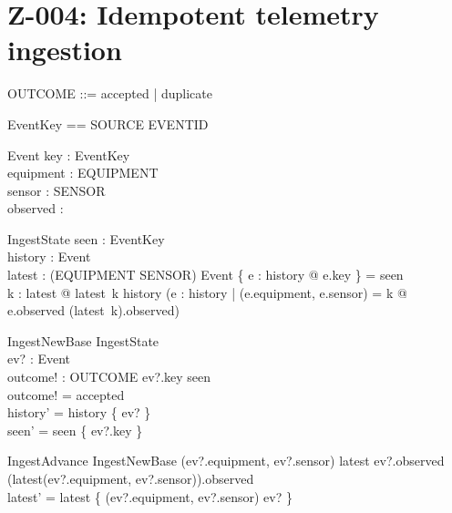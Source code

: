 \documentclass{article}
\begin{document}
\section*{Z-004: Idempotent telemetry ingestion}

\begin{zed}
\end{zed}

\begin{zed}
  OUTCOME ::= accepted | duplicate
\end{zed}

\begin{zed}
  EventKey == SOURCE \cross EVENTID
\end{zed}

\begin{schema}{Event}
  key : EventKey \\
  equipment : EQUIPMENT \\
  sensor : SENSOR \\
  observed : \nat
\end{schema}

\begin{schema}{IngestState}
  seen : \power EventKey \\
  history : \power Event \\
  latest : (EQUIPMENT \cross SENSOR) \pfun Event
\where
  \{ e : history @ e.key \} = seen \\
  \forall k : \dom latest @ latest~k \in history \land
    (\forall e : history | (e.equipment, e.sensor) = k @
       e.observed \leq (latest~k).observed)
\end{schema}

\begin{schema}{IngestNewBase}
  \Delta IngestState \\
  ev? : Event \\
  outcome! : OUTCOME
\where
  ev?.key \notin seen \\
  outcome! = accepted \\
  history' = history \cup \{ ev? \} \\
  seen' = seen \cup \{ ev?.key \}
\end{schema}

\begin{schema}{IngestAdvance}
  IngestNewBase
\where
  (ev?.equipment, ev?.sensor) \notin \dom latest \lor
    ev?.observed \geq (latest(ev?.equipment, ev?.sensor)).observed \\
  latest' = latest \oplus \{ (ev?.equipment, ev?.sensor) \mapsto ev? \}
\end{schema}
\end{document}
